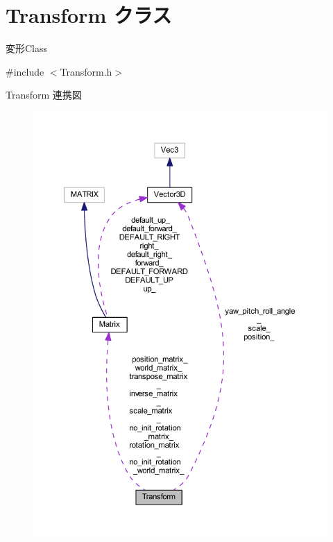 \hypertarget{class_transform}{}\section{Transform クラス}
\label{class_transform}


変形\+Class  




{\ttfamily \#include $<$Transform.\+h$>$}



Transform 連携図\nopagebreak
\begin{figure}[H]
\begin{center}
\leavevmode
\includegraphics[width=350pt]{class_transform__coll__graph}
\end{center}
\end{figure}
